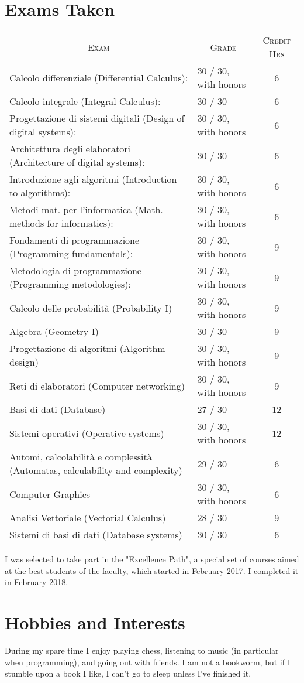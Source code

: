 \documentclass[a4paper,10pt]{article} %
\begin{document}
\section{Exams Taken}
\begin{center}
\begin{tabular}{llc}
\multicolumn{1}{c}{\textsc{Exam}} & \multicolumn{1}{c}{\textsc{Grade}} &\textsc{Credit Hrs}\\
Calcolo differenziale (Differential Calculus): & 30 / 30, with honors & 6 \\
Calcolo integrale (Integral Calculus): & 30 / 30 & 6 \\
Progettazione di sistemi digitali (Design of digital systems): & 30 / 30, with honors & 6 \\
Architettura degli elaboratori (Architecture of digital systems): & 30 / 30 & 6 \\
Introduzione agli algoritmi (Introduction to algorithms): & 30 / 30, with honors & 6 \\
Metodi mat. per l'informatica (Math. methods for informatics): & 30 / 30, with honors & 6 \\
Fondamenti di programmazione (Programming fundamentals): & 30 / 30, with honors & 9 \\
Metodologia di programmazione (Programming metodologies): & 30 / 30, with honors & 9 \\
Calcolo delle probabilit\`a (Probability I) & 30 / 30, with honors & 9 \\
Algebra (Geometry I) & 30 / 30 & 9 \\
Progettazione di algoritmi (Algorithm design)  & 30 / 30, with honors & 9 \\
Reti di elaboratori (Computer networking)  & 30 / 30, with honors & 9 \\
Basi di dati (Database) & 27 / 30 & 12 \\
Sistemi operativi (Operative systems) & 30 / 30, with honors & 12 \\
Automi, calcolabilit\`a e complessit\`a (Automatas, calculability and complexity) & 29 / 30 & 6 \\
Computer Graphics & 30 / 30, with honors & 6 \\
Analisi Vettoriale (Vectorial Calculus) & 28 / 30 & 9 \\
Sistemi di basi di dati (Database systems) & 30 / 30 & 6 \\
\end{tabular}
\end{center}
I was selected to take part in the "Excellence Path", a special set of courses aimed at the best students of the faculty, which started in February 2017. I completed it in February 2018.


\bigskip

\section{Hobbies and Interests}
During my spare time I enjoy playing chess, listening to music (in particular when programming), and going out with friends.
I am not a bookworm, but if I stumble upon a book I like, I can't go to sleep unless I've finished it.
\end{document}
